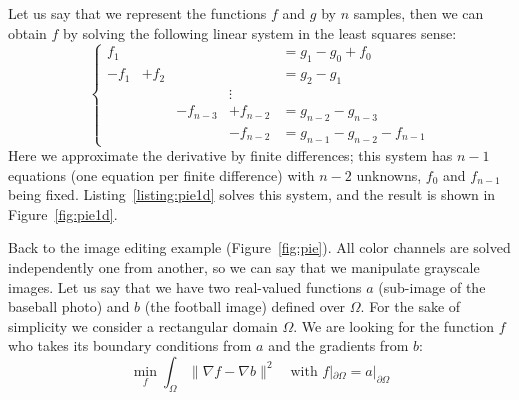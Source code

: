 \documentclass[notitlepage,oneside]{book}
\begin{document}
Let us say that we represent the functions $f$ and $g$ by $n$ samples, then we can obtain $f$ by solving the following linear system in the least squares sense:
\begin{equation}
\label{eq:pie1d}
\left \{ \begin{array}{ccccl}
f_1 &       &       &           & =  g_1 - g_0 + f_0  \\
-f_1 & + f_2 &       &           & = g_2 - g_1 \\
    &       &       & \vdots    &             \\
     &        &  -f_{n-3}     &  +f_{n-2}          & = g_{n-2} - g_{n-3} \\
     &        &       & - f_{n-2} & =  g_{n-1}-g_{n-2} -f_{n-1}
\end{array} \right.
\end{equation}
Here we approximate the derivative by finite differences;
this system has $n-1$ equations (one equation per finite difference) with $n-2$ unknowns, $f_0$ and $f_{n-1}$ being fixed.
Listing~\ref{listing:pie1d} solves this system, and the result is shown in  Figure~\ref{fig:pie1d}.

Back to the image editing example (Figure~\ref{fig:pie}). All color channels are solved independently one from another, so we can say that we manipulate grayscale images.
Let us say that we have two real-valued functions $a$ (sub-image of the baseball photo) and $b$ (the football image) defined over $\Omega$.
For the sake of simplicity we consider a rectangular domain $\Omega$.
We are looking for the function $f$ who takes its boundary conditions from $a$ and the gradients from $b$:
$$
\min\limits_{f} \int_\Omega \|\nabla f - \nabla b\|^2 \quad \text{with~} f|_{\partial\Omega} = a|_{\partial\Omega}
$$
\end{document}
